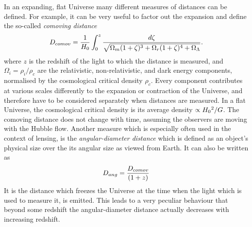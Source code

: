 In an expanding, flat Universe many different measures of distances can be
defined.  For example, it can be very useful to factor out the expansion and
define the so-called \textit{comoving distance}
%
\begin{equation}\eqlbl{d_comov}%
    D_{comov} = \frac{1}{\Ho} \int_0^{z} \frac{d\zeta}{\sqrt{\Omega_m(1+\zeta)^3
    + \Omega_r(1+\zeta)^4 + \Omega_\Lambda}}.
\end{equation}
%
where $z$ is the redshift of the light to which the distance is measured, and
$\Omega_i=\rho_i/\rho_c$ are the relativistic, non-relativistic, and dark energy
components, normalised by the cosmological critical density $\rho_c$.  Every
component contributes at various scales differently to the expansion or
contraction of the Universe, and therefore have to be considered separately when
distances are measured.  In a flat Universe, the cosmological critical density
is its average density $\propto H_{0}{}^{2}/G$.  The comoving distance does not change with time,
assuming the observers are moving with the Hubble flow.  Another measure which
is especially often used in the context of lensing, is the
\textit{angular-diameter distance} which is defined as an object's physical size
over the its angular size as viewed from Earth. It can also be written as
%
\begin{equation}\eqlbl{d_comov}%
    D_{ang} = \frac{D_{comov}}{(1+z)}
\end{equation}
%
It is the distance which freezes the Universe at the time when the light which
is used to measure it, is emitted.  This leads to a very peculiar behaviour that
beyond some redshift the angular-diameter distance actually decreases with
increasing redshift.

